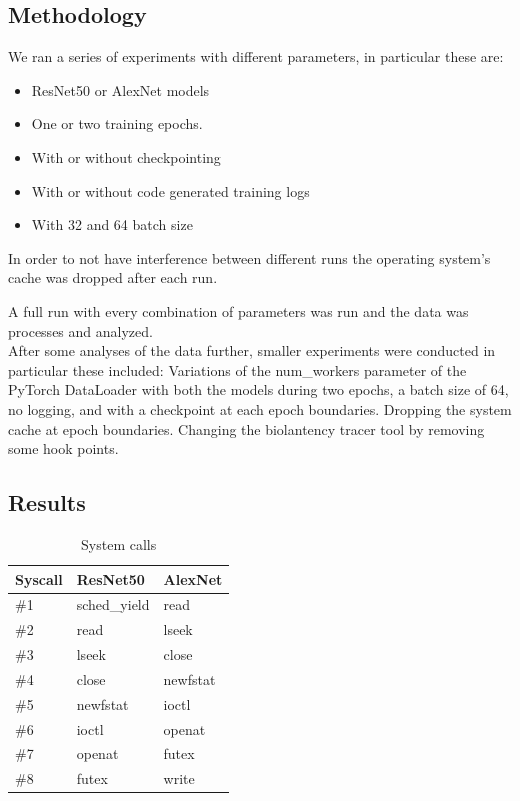 \documentclass[conference]{IEEEtran}
\begin{document}
\subsection{Methodology}

We ran a series of experiments with different parameters, in particular these are:
\begin{itemize}
	\item ResNet50 or AlexNet models
	\item One or two training epochs.
	\item With or without checkpointing
	\item With or without code generated training logs
	\item With 32 and 64 batch size
\end{itemize}
In order to not have interference between different runs the operating system's cache was dropped after each run.

A full run with every combination of parameters was run and the data was processes and analyzed.\\
After some analyses of the data further, smaller experiments were conducted in particular these included:
Variations of the num\_workers parameter of the PyTorch DataLoader with both the models during two epochs, a batch size of 64, no logging, and with a checkpoint at each epoch boundaries.
Dropping the system cache at epoch boundaries.
Changing the biolantency tracer tool by removing some hook points.


\subsection{Results}

\begin{table}
    \caption{System calls}\label{tab:syscalls}
    \begin{center}
        \begin{tabular}[c]{|l|l|l|}
            \hline
            \rowcolor{gray}
            Syscall & ResNet50 & AlexNet\\
            \hline
            \rowcolor{lightgray}
            \#1 & sched\_yield & read\\
            \hline
            \#2 & read & lseek\\
            \hline
            \rowcolor{lightgray}
            \#3 & lseek & close\\
            \hline
            \#4 & close & newfstat\\
            \hline
            \rowcolor{lightgray}
            \#5 & newfstat & ioctl\\
            \hline
            \#6 & ioctl & openat\\
            \hline
            \rowcolor{lightgray}
            \#7 & openat & futex\\
            \hline
            \#8 & futex & write\\
            \hline
        \end{tabular}
    \end{center}
\end{table}
\end{document}

